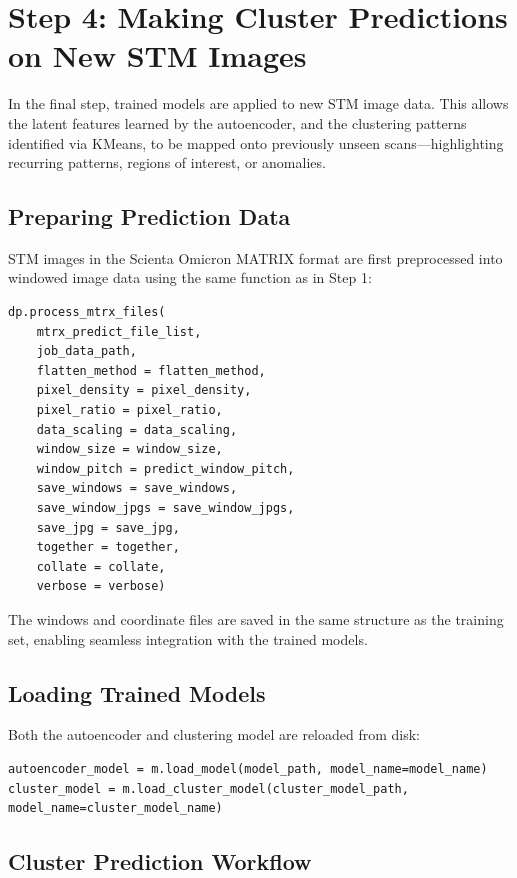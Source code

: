 \documentclass[11pt]{article}
\begin{document}
\section*{Step 4: Making Cluster Predictions on New STM Images}

In the final step, trained models are applied to new STM image data. This allows the latent features learned by the autoencoder, and the clustering patterns identified via KMeans, to be mapped onto previously unseen scans—highlighting recurring patterns, regions of interest, or anomalies.

\subsection*{Preparing Prediction Data}

STM images in the Scienta Omicron MATRIX format are first preprocessed into windowed image data using the same function as in Step 1:

\begin{verbatim}
dp.process_mtrx_files(
    mtrx_predict_file_list,
    job_data_path,
    flatten_method = flatten_method,
    pixel_density = pixel_density,
    pixel_ratio = pixel_ratio,
    data_scaling = data_scaling,
    window_size = window_size, 
    window_pitch = predict_window_pitch,
    save_windows = save_windows,
    save_window_jpgs = save_window_jpgs,
    save_jpg = save_jpg,
    together = together,
    collate = collate,
    verbose = verbose)
\end{verbatim}

The windows and coordinate files are saved in the same structure as the training set, enabling seamless integration with the trained models.

\subsection*{Loading Trained Models}

Both the autoencoder and clustering model are reloaded from disk:

\begin{verbatim}
autoencoder_model = m.load_model(model_path, model_name=model_name)
cluster_model = m.load_cluster_model(cluster_model_path, model_name=cluster_model_name)
\end{verbatim}

\subsection*{Cluster Prediction Workflow}
\end{document}
